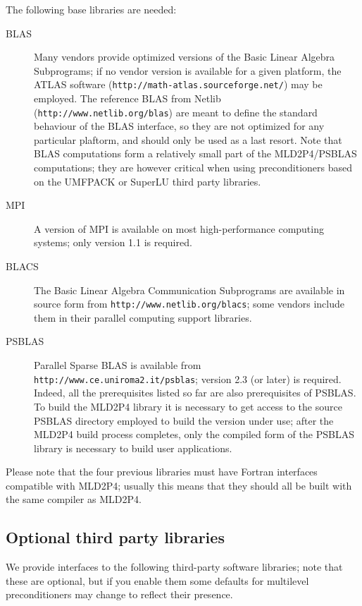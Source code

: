 The following base libraries are needed: 
\begin{description}
\item[BLAS] \cite{blas3,blas2,blas1} Many vendors provide optimized versions
  of the Basic Linear Algebra Subprograms; if no vendor version is
  available for a given platform, the ATLAS software
  (\verb!http://math-atlas.sourceforge.net/!)
  may be employed.  The reference BLAS from Netlib
  (\verb|http://www.netlib.org/blas|) are meant to define the standard
  behaviour of the BLAS interface, so they are not optimized for any
  particular plaftorm, and should only be used as a last
  resort. Note that BLAS computations form a relatively small part of
  the MLD2P4/PSBLAS computations; they are however critical when using
  preconditioners based on the UMFPACK or SuperLU third party
  libraries.  
\item[MPI] \cite{MPI2,MPI1} A version of MPI is available on most
  high-performance computing systems; only version 1.1 is required.
\item[BLACS] \cite{BLACS} The Basic Linear Algebra Communication Subprograms
  are available in source form from \verb|http://www.netlib.org/blacs|;
  some vendors  include them in their parallel computing
  support libraries.
 \item[PSBLAS] \cite{PSBLASGUIDE,psblas_00} Parallel Sparse BLAS is
  available from \\ \verb|http://www.ce.uniroma2.it/psblas|; version 2.3
  (or later) is required. Indeed, all the prerequisites
  listed so far are also prerequisites of PSBLAS.
  To build the MLD2P4 library it is necessary to get access to
  the source PSBLAS directory employed to build the version under use; after
  the MLD2P4 build process completes, only the compiled form of the
  PSBLAS library is necessary to build user applications.
\end{description}

Please note that the four previous libraries must have Fortran
interfaces compatible with MLD2P4;
usually this means that they should all be built with the same
compiler as MLD2P4.

\subsection{Optional third party libraries}

We provide interfaces to the following third-party software libraries;
note that these are optional, but if you enable them some defaults
for multilevel preconditioners may change to reflect their presence. 

